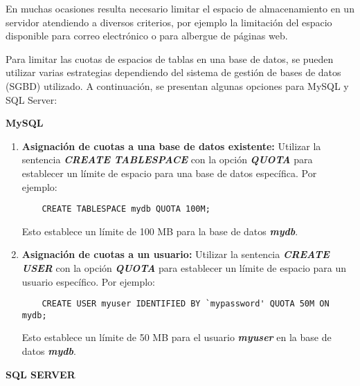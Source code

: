 En muchas ocasiones resulta necesario limitar el espacio de almacenamiento en un servidor atendiendo a diversos criterios, por ejemplo la limitación del espacio disponible para correo electrónico o para albergue de páginas web.

Para limitar las cuotas de espacios de tablas en una base de datos, se pueden utilizar varias estrategias dependiendo del sistema de gestión de bases de datos (SGBD) utilizado. A continuación, se presentan algunas opciones para MySQL y SQL Server:

\textbf{MySQL}

\begin{enumerate}
  \item \textbf{Asignación de cuotas a una base de datos existente:} Utilizar la sentencia \textbf{\emph{CREATE TABLESPACE}} con la opción \textbf{\emph{QUOTA}} para establecer un límite de espacio para una base de datos específica. Por ejemplo:
  
  \begin{lstlisting}
    CREATE TABLESPACE mydb QUOTA 100M;
  \end{lstlisting}
  
  Esto establece un límite de 100 MB para la base de datos \textbf{\emph{mydb}}.

  \item \textbf{Asignación de cuotas a un usuario:} Utilizar la sentencia \textbf{\emph{CREATE USER}} con la opción \textbf{\emph{QUOTA}} para establecer un límite de espacio para un usuario específico. Por ejemplo:

  \begin{lstlisting}
    CREATE USER myuser IDENTIFIED BY `mypassword' QUOTA 50M ON mydb;
  \end{lstlisting}

  Esto establece un límite de 50 MB para el usuario \textbf{\emph{myuser}} en la base de datos \textbf{\emph{mydb}}.

\end{enumerate}

\textbf{SQL SERVER}

